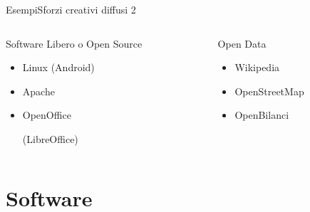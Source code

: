 \documentclass[italian,compress,red]{beamer}
\begin{document}
\begin{frame}{Esempi}{Sforzi creativi diffusi 2}
\begin{columns}[T]
  \begin{column}{.5\textwidth}
   
   \begin{exampleblock}{Software Libero o Open Source}
  \begin{itemize}
    \item Linux (Android)
    \item Apache
    \item OpenOffice \begin{tiny}(LibreOffice)\end{tiny}
  \end{itemize}
  \end{exampleblock}
  \end{column}
  \pause
  \begin{column}{.5\textwidth}
   \begin{exampleblock}{Open Data}
  \begin{itemize}
    \item Wikipedia
    \item OpenStreetMap
    \item {} \hspace{0.5ex} OpenBilanci
  \end{itemize}
  \end{exampleblock}
  \end{column}

  \end{columns}

\end{frame} 
  
\section{Software}
\end{document}

